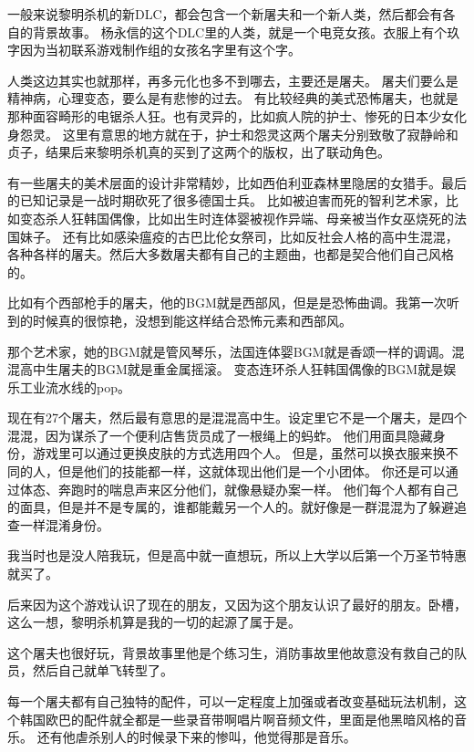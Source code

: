 一般来说黎明杀机的新DLC，都会包含一个新屠夫和一个新人类，然后都会有各自的背景故事。
杨永信的这个DLC里的人类，就是一个电竞女孩。衣服上有个玖字因为当初联系游戏制作组的女孩名字里有这个字。

人类这边其实也就那样，再多元化也多不到哪去，主要还是屠夫。
屠夫们要么是精神病，心理变态，要么是有悲惨的过去。
有比较经典的美式恐怖屠夫，也就是那种面容畸形的电锯杀人狂。也有灵异的，比如疯人院的护士、惨死的日本少女化身怨灵。
这里有意思的地方就在于，护士和怨灵这两个屠夫分别致敬了寂静岭和贞子，结果后来黎明杀机真的买到了这两个的版权，出了联动角色。


有一些屠夫的美术层面的设计非常精妙，比如西伯利亚森林里隐居的女猎手。最后的已知记录是一战时期砍死了很多德国士兵。
比如被迫害而死的智利艺术家，比如变态杀人狂韩国偶像，比如出生时连体婴被视作异端、母亲被当作女巫烧死的法国妹子。
还有比如感染瘟疫的古巴比伦女祭司，比如反社会人格的高中生混混，各种各样的屠夫。然后大多数屠夫都有自己的主题曲，也都是契合他们自己风格的。

比如有个西部枪手的屠夫，他的BGM就是西部风，但是是恐怖曲调。我第一次听到的时候真的很惊艳，没想到能这样结合恐怖元素和西部风。

那个艺术家，她的BGM就是管风琴乐，法国连体婴BGM就是香颂一样的调调。混混高中生屠夫的BGM就是重金属摇滚。
变态连环杀人狂韩国偶像的BGM就是娱乐工业流水线的pop。

现在有27个屠夫，然后最有意思的是混混高中生。设定里它不是一个屠夫，是四个混混，因为谋杀了一个便利店售货员成了一根绳上的蚂蚱。
他们用面具隐藏身份，游戏里可以通过更换皮肤的方式选用四个人。
但是，虽然可以换衣服来换不同的人，但是他们的技能都一样，这就体现出他们是一个小团体。
你还是可以通过体态、奔跑时的喘息声来区分他们，就像悬疑办案一样。
他们每个人都有自己的面具，但是并不是专属的，谁都能戴另一个人的。就好像是一群混混为了躲避追查一样混淆身份。

我当时也是没人陪我玩，但是高中就一直想玩，所以上大学以后第一个万圣节特惠就买了。

后来因为这个游戏认识了现在的朋友，又因为这个朋友认识了最好的朋友。卧槽，这么一想，黎明杀机算是我的一切的起源了属于是。

这个屠夫也很好玩，背景故事里他是个练习生，消防事故里他故意没有救自己的队员，然后自己就单飞转型了。

每一个屠夫都有自己独特的配件，可以一定程度上加强或者改变基础玩法机制，这个韩国欧巴的配件就全都是一些录音带啊唱片啊音频文件，里面是他黑暗风格的音乐。
还有他虐杀别人的时候录下来的惨叫，他觉得那是音乐。

